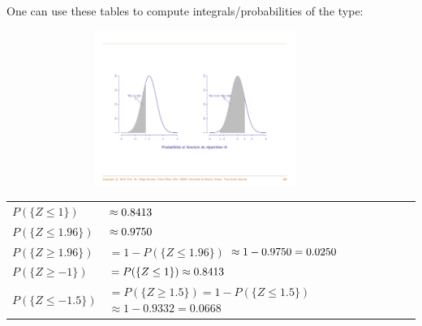 \documentclass[smaller]{beamer}\usepackage[]{graphicx}\usepackage[]{color}
\begin{document}
\begin{frame}{\subsecname}
  One can use these tables to compute integrals/probabilities of the type:
  \begin{figure}[ptb]\centering
  \includegraphics[height=2in, width=4in]{img/CDF_pr.pdf}%
  \end{figure}
\end{frame}

\begin{frame}{\subsecname}

\begin{example}[Prob of $Z$]
\begin{footnotesize}
  \begin{tabular}{ll}
  $P(\{Z\leq 1\})$ & $\approx0.8413\bigskip $ \\
  $P(\{Z\leq 1.96\})$ & $\approx0.9750\bigskip $ \\
  $P(\{Z\geq 1.96\})$ & $=1-P(\{Z\leq 1.96\})$ $\approx1-0.9750=0.0250\bigskip $\\
  $P(\{Z\geq -1\})$ & $=P(\{Z\leq 1\})\approx0.8413\bigskip $ \\
  $P(\{Z\leq -1.5\})$ & $=P(\{Z\geq 1.5\}) =1-P(\{Z\leq 1.5\})$ $\approx1-0.9332=0.0668$%
  \end{tabular}
  \end{footnotesize}
  \end{example}
\end{frame}%
\end{document}
